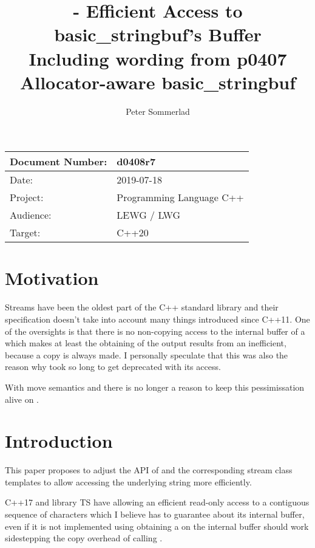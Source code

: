 \documentclass[ebook,11pt,article]{memoir}
\title{\papernumber{} - Efficient Access to basic\_stringbuf's Buffer\\
Including wording from p0407 Allocator-aware basic\_stringbuf}
\author{Peter Sommerlad}
\date{\paperdate}                        %
\newcommand{\papernumber}{d0408r7}
\newcommand{\paperdate}{2019-07-18}
\begin{document}
\maketitle
\begin{tabular}[t]{|l|l|}\hline 
Document Number: & \papernumber  \\\hline
Date: & \paperdate \\\hline
Project: & Programming Language C++\\\hline 
Audience: & LEWG / LWG\\\hline
Target: & C++20\\\hline
\end{tabular}

\chapter{Motivation}
Streams have been the oldest part of the C++ standard library and their specification doesn't take into account many things introduced since C++11. One of  the oversights is that there is no non-copying access to the internal buffer of a  which makes at least the obtaining of the output results from an  inefficient, because a copy is always made. I personally speculate that this was also the reason why  took so long to get deprecated with its  access.

With move semantics and  there is no longer a reason to keep this pessimissation alive on .


\chapter{Introduction}
This paper proposes to adjust the API of  and the corresponding stream class templates to allow accessing the underlying string more efficiently.

C++17 and library TS have  allowing an efficient read-only access to a contiguous sequence of characters which I believe  has to guarantee about its internal buffer, even if it is not implemented using  obtaining a  on the internal buffer should work sidestepping the copy overhead of calling . 
\end{document}
